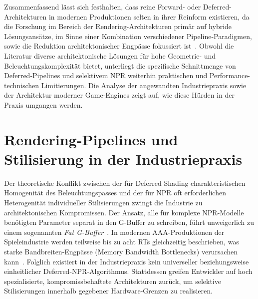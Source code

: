 Zusammenfassend lässt sich festhalten, dass reine Forward- oder Deferred-Architekturen in modernen Produktionen
selten in ihrer Reinform existieren, da die Forschung im Bereich der Rendering-Architekturen primär auf
hybride Lösungsansätze, im Sinne einer Kombination verschiedener Pipeline-Paradigmen, sowie die Reduktion
architektonischer Engpässe fokussiert ist~\parencite[vgl.][S.~56]{burnsVisibilityBufferCacheFriendly2013}.
Obwohl die Literatur diverse architektonische Lösungen für hohe Geometrie- und Beleuchtungskomplexität bietet,
unterliegt die spezifische Schnittmenge von Deferred-Pipelines und selektivem \ac{NPR} weiterhin
praktischen und Performance-technischen Limitierungen.
Die Analyse der angewandten Industriepraxis sowie der Architektur moderner Game-Engines zeigt auf, wie
diese Hürden in der Praxis umgangen werden.


\section{Rendering-Pipelines und Stilisierung in der Industriepraxis}
\label{sec:0302_industry_state}

Der theoretische Konflikt zwischen der für Deferred Shading charakteristischen Homogenität des Beleuchtungspasses und
der für \ac{NPR} oft erforderlichen Heterogenität individueller Stilisierungen zwingt die
Industrie zu architektonischen Kompromissen.
Der Ansatz, alle für komplexe \ac{NPR}-Modelle benötigten Parameter separat in den \ac{G-Buffer} zu schreiben, führt
unweigerlich zu einem sogenannten \textit{Fat \ac{G-Buffer}}~\parencite[vgl.][S.~71]{AdvancesRealTimeRendering}.
In modernen AAA-Produktionen der Spieleindustrie werden teilweise bis zu acht \acp{RT} gleichzeitig
beschrieben, was starke Bandbreiten-Engpässe (Memory Bandwidth Bottlenecks) verursachen
kann~\parencite[vgl.][S.~884]{akenine-mollerRealtimeRendering2019}.
Folglich existiert in der Industriepraxis kein universeller beziehungsweise einheitlicher Deferred-\ac{NPR}-Algorithmus.
Stattdessen greifen Entwickler auf hoch spezialisierte, kompromissbehaftete Architekturen zurück, um selektive
Stilisierungen innerhalb gegebener Hardware-Grenzen zu realisieren.


